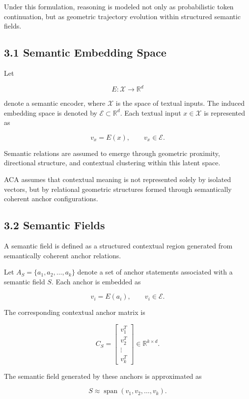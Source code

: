 \documentclass[11pt]{article}
\begin{document}
Under this formulation, reasoning is modeled not only as probabilistic token continuation, but as geometric trajectory evolution within structured semantic fields.

\subsection{3.1 Semantic Embedding Space}

Let

$$
E:\mathcal{X}\rightarrow\mathbb{R}^{d}
$$

denote a semantic encoder, where $\mathcal{X}$ is the space of textual inputs. The induced embedding space is denoted by $\mathcal{E}\subset\mathbb{R}^{d}$. Each textual input $x\in\mathcal{X}$ is represented as

$$
v_x = E(x),
\qquad
v_x\in\mathcal{E}.
$$

Semantic relations are assumed to emerge through geometric proximity, directional structure, and contextual clustering within this latent space.

ACA assumes that contextual meaning is not represented solely by isolated vectors, but by relational geometric structures formed through semantically coherent anchor configurations.

\subsection{3.2 Semantic Fields}

A semantic field is defined as a structured contextual region generated from semantically coherent anchor relations.

Let $A_S=\{a_1,a_2,\dots,a_k\}$ denote a set of anchor statements associated with a semantic field $S$. Each anchor is embedded as

$$
v_i=E(a_i),
\qquad
v_i\in\mathcal{E}.
$$

The corresponding contextual anchor matrix is

$$
C_S
=
\begin{bmatrix}
v_1^{T}\\
v_2^{T}\\
\vdots\\
v_k^{T}
\end{bmatrix}
\in\mathbb{R}^{k\times d}.
$$

The semantic field generated by these anchors is approximated as

$$
S
\approx
\operatorname{span}(v_1,v_2,\dots,v_k).
$$
\end{document}
